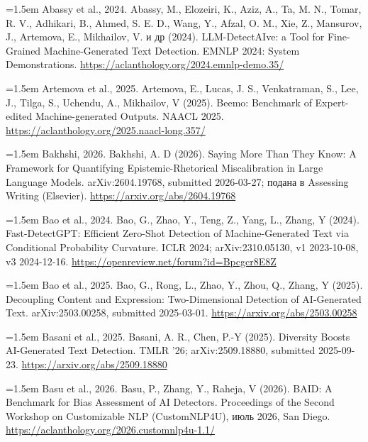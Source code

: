 \documentclass[11pt,a4paper]{article}
\renewcommand{\_}{\textunderscore\allowbreak}
\begin{document}
\noindent\hangindent=1.5em Abassy et al., 2024. Abassy, M., Elozeiri, K., Aziz, A., Ta, M. N., Tomar, R. V., Adhikari, B., Ahmed, S. E. D., Wang, Y., Afzal, O. M., Xie, Z., Mansurov, J., Artemova, E., Mikhailov, V. и др (2024). LLM-DetectAIve: a Tool for Fine-Grained Machine-Generated Text Detection. EMNLP 2024: System Demonstrations. \url{https://aclanthology.org/2024.emnlp-demo.35/}\par\smallskip

\noindent\hangindent=1.5em Artemova et al., 2025. Artemova, E., Lucas, J. S., Venkatraman, S., Lee, J., Tilga, S., Uchendu, A., Mikhailov, V (2025). Beemo: Benchmark of Expert-edited Machine-generated Outputs. NAACL 2025. \url{https://aclanthology.org/2025.naacl-long.357/}\par\smallskip

\noindent\hangindent=1.5em Bakhshi, 2026. Bakhshi, A. D (2026). Saying More Than They Know: A Framework for Quantifying Epistemic-Rhetorical Miscalibration in Large Language Models. arXiv:2604.19768, submitted 2026-03-27; подана в Assessing Writing (Elsevier). \url{https://arxiv.org/abs/2604.19768}\par\smallskip

\noindent\hangindent=1.5em Bao et al., 2024. Bao, G., Zhao, Y., Teng, Z., Yang, L., Zhang, Y (2024). Fast-DetectGPT: Efficient Zero-Shot Detection of Machine-Generated Text via Conditional Probability Curvature. ICLR 2024; arXiv:2310.05130, v1 2023-10-08, v3 2024-12-16. \url{https://openreview.net/forum?id=Bpcgcr8E8Z}\par\smallskip

\noindent\hangindent=1.5em Bao et al., 2025. Bao, G., Rong, L., Zhao, Y., Zhou, Q., Zhang, Y (2025). Decoupling Content and Expression: Two-Dimensional Detection of AI-Generated Text. arXiv:2503.00258, submitted 2025-03-01. \url{https://arxiv.org/abs/2503.00258}\par\smallskip

\noindent\hangindent=1.5em Basani et al., 2025. Basani, A. R., Chen, P.-Y (2025). Diversity Boosts AI-Generated Text Detection. TMLR '26; arXiv:2509.18880, submitted 2025-09-23. \url{https://arxiv.org/abs/2509.18880}\par\smallskip

\noindent\hangindent=1.5em Basu et al., 2026. Basu, P., Zhang, Y., Raheja, V (2026). BAID: A Benchmark for Bias Assessment of AI Detectors. Proceedings of the Second Workshop on Customizable NLP (CustomNLP4U), июль 2026, San Diego. \url{https://aclanthology.org/2026.customnlp4u-1.1/}\par\smallskip
\end{document}
